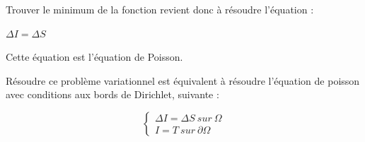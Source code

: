 Trouver le minimum de la fonction revient donc à résoudre l'équation : 
\begin{center}
$\Delta I = \Delta S$
\end{center}
Cette équation est l'équation de Poisson. 

Résoudre ce problème variationnel est équivalent à résoudre l'équation de poisson avec conditions aux bords de Dirichlet, suivante :
\begin{center}
    \begin{equation*}
        \left\{
        \begin{aligned}
         \Delta I = \Delta S  \ sur \  \Omega \\
          I = T \ sur \  \partial \Omega
        \end{aligned}
        \right.
    \end{equation*}
\end{center}
